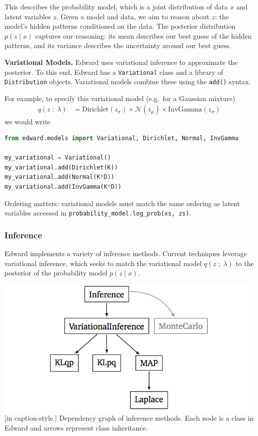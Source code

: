 This describes the probability model, which is a joint distribution of
data $x$ and latent variables $z$. Given a model and data, we aim to
reason about $z$: the model's hidden patterns conditioned on the data. The
posterior distribution $p(z \mid x)$ captures our reasoning: its mean
describes our best guess of the hidden patterns, and its variance
describes the uncertainty around our best guess.

\textbf{Variational Models.}
Edward uses variational inference to approximate the posterior. To
this end, Edward has a \texttt{Variational} class and a library of
\texttt{Distribution} objects. Variational models combine these
using the \texttt{add()} syntax.

For example, to specify this variational model (e.g.~for a Gaussian mixture)
\begin{align*}
  q(z \;;\; \lambda)
  &=
  \text{Dirichlet}(z_\pi)
  \times
  \mathcal{N}(z_\mu)
  \times
  \text{InvGamma}(z_\sigma)
\end{align*}
we would write
\begin{lstlisting}[language=Python]
from edward.models import Variational, Dirichlet, Normal, InvGamma

my_variational = Variational()
my_variational.add(Dirichlet(K))
my_variational.add(Normal(K*D))
my_variational.add(InvGamma(K*D))
\end{lstlisting}
Ordering matters: variational models must match the same ordering as latent
variables accessed in \texttt{probability_model.log_prob(xs, zs)}.

\subsubsection{Inference}\label{inference}

Edward implements a variety of inference methods. Current techniques
leverage variational inference, which seeks to match the variational model
$q(z \;;\; \lambda)$ to the posterior of the probability model
$p(z \mid x)$.

\includegraphics{images/inference_structure.png}
[in caption-style.] Dependency graph of inference methods. Each
node is a class in Edward and arrows represent class inheritance.

